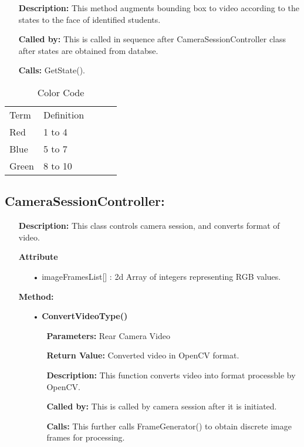 \documentclass{scrreprt}
\begin{document}
\begin{enumerate}
\begin{itemize}
\begin{itemize}
\item [] \textbf{Description:} This method augments bounding box to video according to the states to the face of identified students. 
\item [] \textbf{Called by:} This is called in sequence after CameraSessionController class after states are obtained from databse.
\item [] \textbf{Calls:} GetState().
\end{itemize}
\begin{table}[h]
\centering
\label{label-2}
\begin{tabular}{|l|l|lll}
\cline{1-2}
Term      & Definition                                                   &  &  &  \\ \cline{1-2}
\color{red}Red & 1 to 4        &  &  &  \\ \cline{1-2}
\color{blue}Blue & 5 to 7              &  &  &  \\ \cline{1-2}
\color{green}Green & 8 to 10 &  &  &  \\ \cline{1-2}

\end{tabular}
\caption{Color Code}
\end{table}

\end{itemize}
\end{enumerate}

\subsection{CameraSessionController:}
\begin{enumerate}
\item[] \textbf{Description:} This class controls camera session, and converts format of video.
\item[] \textbf{Attribute}
\begin{itemize}
\item [•]imageFramesList[] : 2d Array of integers representing RGB values.
\end{itemize}
\item[] \textbf{Method:}
\begin{itemize}
\item [•] \textbf{ConvertVideoType()}
\begin{itemize}
\item [] \textbf{Parameters:} Rear Camera Video 
\item [] \textbf{Return Value:} Converted video in OpenCV format.
\item [] \textbf{Description:} This function converts video into format processble by OpenCV. 
\item [] \textbf{Called by:} This is called by camera session after it is initiated.  
\item [] \textbf{Calls:} This further calls FrameGenerator() to obtain discrete image frames for processing.
\end{itemize}

\end{itemize}
\end{enumerate}
\end{document}

